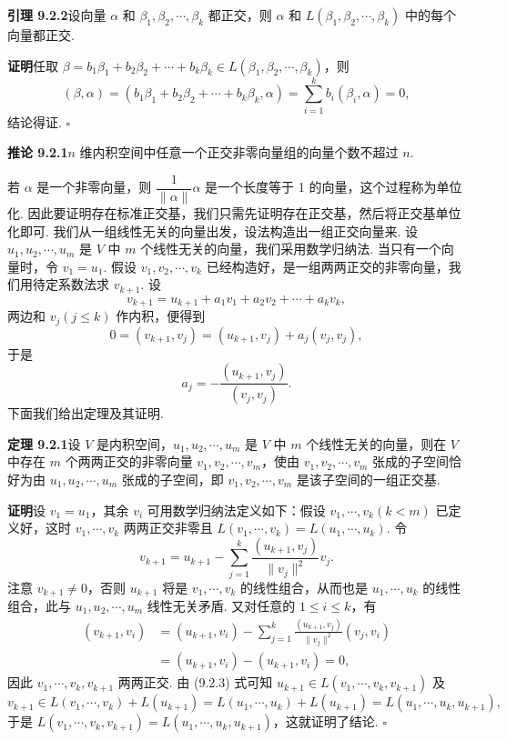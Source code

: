 \documentclass[UTF8, 12pt, fontset=fandol, oneside]{ctexart}
\begin{document}
\noindent\textbf{引理 9.2.2}\quad 设向量 $\alpha$ 和 $\beta_1,\beta_2,\cdots,\beta_k$ 都正交，则 $\alpha$ 和 $L(\beta_1,\beta_2,\cdots,\beta_k)$ 中的每个向量都正交.

\noindent\textbf{证明}\quad 任取 $\beta=b_1\beta_1+b_2\beta_2+\cdots+b_k\beta_k\in L(\beta_1,\beta_2,\cdots,\beta_k)$，则
\[
  (\beta,\alpha)=(b_1\beta_1+b_2\beta_2+\cdots+b_k\beta_k,\alpha)
  =\sum_{i=1}^k b_i(\beta_i,\alpha)=0,
\]
结论得证. $\square$

\noindent\textbf{推论 9.2.1}\quad $n$ 维内积空间中任意一个正交非零向量组的向量个数不超过 $n$.

若 $\alpha$ 是一个非零向量，则 $\dfrac1{\|\alpha\|}\alpha$ 是一个长度等于 1 的向量，这个过程称为单位化. 因此要证明存在标准正交基，我们只需先证明存在正交基，然后将正交基单位化即可. 我们从一组线性无关的向量出发，设法构造出一组正交向量来. 设 $u_1,u_2,\cdots,u_m$ 是 $V$ 中 $m$ 个线性无关的向量，我们采用数学归纳法. 当只有一个向量时，令 $v_1=u_1$. 假设 $v_1,v_2,\cdots,v_k$ 已经构造好，是一组两两正交的非零向量，我们用待定系数法求 $v_{k+1}$. 设
\[
  v_{k+1}=u_{k+1}+a_1v_1+a_2v_2+\cdots+a_kv_k,
\]
两边和 $v_j(j\le k)$ 作内积，便得到
\[
  0=(v_{k+1},v_j)=(u_{k+1},v_j)+a_j(v_j,v_j),
\]
于是
\[
  a_j=-\frac{(u_{k+1},v_j)}{(v_j,v_j)}.
\]
下面我们给出定理及其证明.

\noindent\textbf{定理 9.2.1}\quad 设 $V$ 是内积空间，$u_1,u_2,\cdots,u_m$ 是 $V$ 中 $m$ 个线性无关的向量，则在 $V$ 中存在 $m$ 个两两正交的非零向量 $v_1,v_2,\cdots,v_m$，使由 $v_1,v_2,\cdots,v_m$ 张成的子空间恰好为由 $u_1,u_2,\cdots,u_m$ 张成的子空间，即 $v_1,v_2,\cdots,v_m$ 是该子空间的一组正交基.

\noindent\textbf{证明}\quad 设 $v_1=u_1$，其余 $v_i$ 可用数学归纳法定义如下：假设 $v_1,\cdots,v_k(k<m)$ 已定义好，这时 $v_1,\cdots,v_k$ 两两正交非零且 $L(v_1,\cdots,v_k)=L(u_1,\cdots,u_k)$. 令
\begin{equation}
  v_{k+1}=u_{k+1}-\sum_{j=1}^k\frac{(u_{k+1},v_j)}{\|v_j\|^2}v_j.
  \tag{9.2.3}
\end{equation}
注意 $v_{k+1}\ne0$，否则 $u_{k+1}$ 将是 $v_1,\cdots,v_k$ 的线性组合，从而也是 $u_1,\cdots,u_k$ 的线性组合，此与 $u_1,u_2,\cdots,u_m$ 线性无关矛盾. 又对任意的 $1\le i\le k$，有
\[
\begin{aligned}
  (v_{k+1},v_i)
  &=(u_{k+1},v_i)-\sum_{j=1}^k\frac{(u_{k+1},v_j)}{\|v_j\|^2}(v_j,v_i)\\
  &=(u_{k+1},v_i)-(u_{k+1},v_i)=0,
\end{aligned}
\]
因此 $v_1,\cdots,v_k,v_{k+1}$ 两两正交. 由 (9.2.3) 式可知 $u_{k+1}\in L(v_1,\cdots,v_k,v_{k+1})$ 及
\[
  v_{k+1}\in L(v_1,\cdots,v_k)+L(u_{k+1})
  =L(u_1,\cdots,u_k)+L(u_{k+1})=L(u_1,\cdots,u_k,u_{k+1}),
\]
于是 $L(v_1,\cdots,v_k,v_{k+1})=L(u_1,\cdots,u_k,u_{k+1})$，这就证明了结论. $\square$
\end{document}
